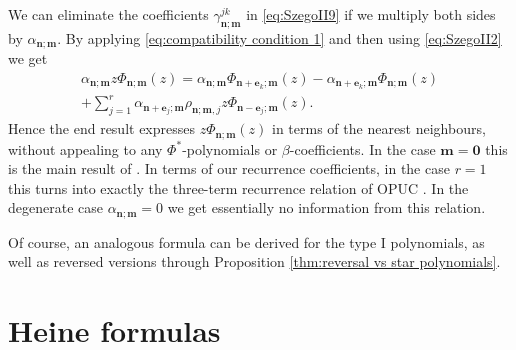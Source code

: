 \documentclass[reqno,centertags,11pt,draft]{amsart}
\begin{document}
We can eliminate the coefficients $\gamma_{\bm{n};\bm{m}}^{jk}$ in \eqref{eq:SzegoII9} if we multiply both sides by $\alpha_{\bm{n};\bm{m}}$. By applying \eqref{eq:compatibility condition 1} and then using \eqref{eq:SzegoII2} we get
\begin{multline}\label{eq:generalized three term}
    \alpha_{\bm{n};\bm{m}}z\Phi_{\bm{n};\bm{m}}(z) = \alpha_{\bm{n};\bm{m}}\Phi_{\bm{n}+\bm{e}_k;\bm{m}}(z) - \alpha_{\bm{n}+\bm{e}_k;\bm{m}}\Phi_{\bm{n};\bm{m}}(z) \\ + \sum_{j = 1}^r \alpha_{\bm{n}+\bm{e}_j;\bm{m}}\rho_{\bm{n};\bm{m},j}z\Phi_{\bm{n}-\bm{e}_j;\bm{m}}(z).
    \end{multline}
Hence the end result expresses $z\Phi_{\bm{n};\bm{m}}(z)$ in terms of the nearest neighbours, without appealing to any $\Phi^*$-polynomials or $\beta$-coefficients. In the case $\bm{m} = \bm{0}$ this is the main result of \cite{MOPUC2}. In terms of our recurrence coefficients, in the case $r=1$ this turns into exactly the three-term recurrence relation of OPUC \cite[Sect. 1.5]{OPUC1}. In the degenerate case $\alpha_{\bm{n};\bm{m}} = 0$ we get essentially no information from this relation. 

Of course, an analogous formula can be derived for the type I polynomials, as well as reversed versions through Proposition \ref{thm:reversal vs star polynomials}.
    









\section{Heine formulas}\label{ss:Heine}
\end{document}
